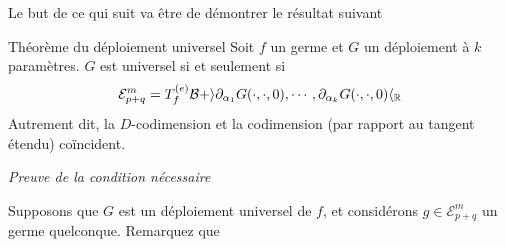 \documentclass[memoire.tex]{subfiles}
\begin{document}
Le but de ce qui suit  va être de démontrer le résultat suivant 
\begin{theobox}{Théorème du déploiement universel}{}\label{unif-depl}
Soit $f$ un germe et $G$ un déploiement à $k$ paramètres. $G$  est  universel si et seulement si
\begin{equation*}
    \mathcal{E}^m_{p+q}=T^{(e)}_f\mathcal{B}+ \rangle \partial_{\alpha_1}G(\cdot,\cdot,0),\cdots, \partial_{\alpha_k}G(\cdot,\cdot,0)\langle_{\mathbb{R}}
\end{equation*}
Autrement dit, la $D$-codimension et la codimension (par rapport au tangent étendu) coïncident.
\end{theobox}
{\par\noindent\textcolor{color-prop}{\textit{Preuve de la condition nécessaire}}\ }


Supposons que $G$ est un 
déploiement universel de $f$, et 
considérons 
$g\in\mathcal{E}^m_{p+q}$ un germe quelconque. Remarquez que 
\end{document}
